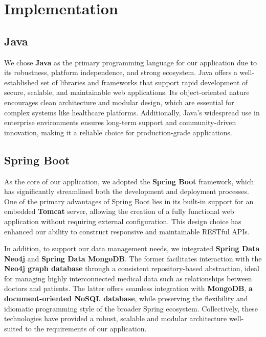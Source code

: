 \section{Implementation}
\subsection{Java}
We chose \textbf{Java} as the primary programming language for our application due to its robustness, platform independence, and strong ecosystem. Java offers a well-established set of libraries and frameworks that support rapid development of secure, scalable, and maintainable web applications. Its object-oriented nature encourages clean architecture and modular design, which are essential for complex systems like healthcare platforms. Additionally, Java's widespread use in enterprise environments ensures long-term support and community-driven innovation, making it a reliable choice for production-grade applications.

\subsection{Spring Boot}
As the core of our application, we adopted the \textbf{Spring Boot} framework, which has significantly streamlined both the development and deployment processes. One of the primary advantages of Spring Boot lies in its built-in support for an embedded \textbf{Tomcat} server, allowing the creation of a fully functional web application without requiring external configuration. This design choice has enhanced our ability to construct responsive and maintainable RESTful APIs. 

In addition, to support our data management needs, we integrated \textbf{Spring Data Neo4j} and \textbf{Spring Data MongoDB}. The former facilitates interaction with the \textbf{Neo4j graph database} through a consistent repository-based abstraction, ideal for managing highly interconnected medical data such as relationships between doctors and patients. The latter offers seamless integration with \textbf{MongoDB}, \textbf{a document-oriented NoSQL database}, while preserving the flexibility and idiomatic programming style of the broader Spring ecosystem. Collectively, these technologies have provided a robust, scalable and modular architecture well-suited to the requirements of our application. 



